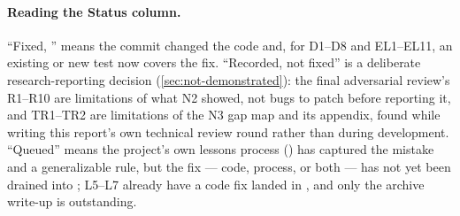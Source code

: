 \paragraph{Reading the Status column.} \enquote{Fixed, } means the commit changed the
code and, for D1--D8 and EL1--EL11, an existing or new test now covers the fix. \enquote{Recorded,
not fixed} is a deliberate research-reporting decision (\cref{sec:not-demonstrated}): the final
adversarial review's R1--R10 are limitations of what N2 showed, not bugs to patch before reporting
it, and TR1--TR2 are limitations of the N3 gap map and its appendix, found while writing this
report's own technical review round rather than during development. \enquote{Queued} means the
project's own lessons process () has captured
the mistake and a generalizable rule, but the fix --- code, process, or both --- has not yet been
drained into ; L5--L7 already have a code fix landed in
, and only the archive write-up is outstanding.
